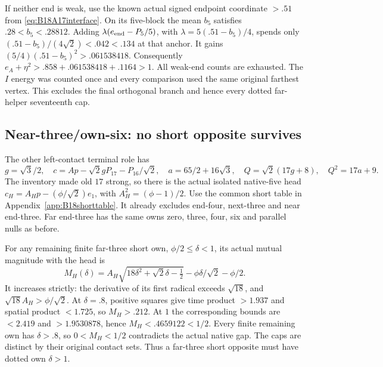 If neither end is weak, use the known actual signed endpoint
coordinate \(>.51\) from \eqref{eq:B18A17interface}.
On its five-block the mean \(b_5\) satisfies \(.28<b_5<.28812\).
Adding \(\lambda(e_{\rm end}-P_5/5)\), with
\(\lambda=5(.51-b_5)/4\), spends only
\((.51-b_5)/(4\sqrt2)<.042<.134\) at that anchor.
It gains \((5/4)(.51-b_5)^2>.061538418\).
Consequently \(e_A+\eta^2>.858+.061538418+.1164>1\).
All weak-end counts are exhausted. The \(I\) energy was counted once
and every comparison used the same original farthest vertex.
This excludes the final orthogonal branch and hence every dotted
far-helper seventeenth cap.

\subsection{Near-three/own-six: no short opposite survives}
\label{app:B18near6}
The other left-contact terminal role has
\[
 g=\sqrt3/2,\quad
 c=Ap-\sqrt2gP_{17}-P_{16}/\sqrt2,\quad
 a=65/2+16\sqrt3,\quad Q=\sqrt2(17g+8),\quad Q^2=17a+9 .
\]
The inventory made old \(17\) strong, so there is the actual
isolated native-five head
\(c_H=A_Hp-(\phi/\sqrt2)e_1\), with
\(A_H^2=(\phi-1)/2\).
Use the common short table in Appendix~\ref{app:B18shorttable}.
It already excludes end-four, next-three and near end-three.
Far end-three has the same owns zero, three, four, six and parallel
nulls as before.

For any remaining finite far-three short own,
\(\phi/2\leq\delta<1\), its actual mutual magnitude with the head is
\[
 M_H(\delta)=A_H\sqrt{18\delta^2+\sqrt2\delta-\tfrac12}
             -\phi\delta/\sqrt2-\phi/2 .
\]
It increases strictly: the derivative of its first radical exceeds
\(\sqrt{18}\), and \(\sqrt{18}A_H>\phi/\sqrt2\).
At \(\delta=.8\), positive squares give time product \(>1.937\)
and spatial product \(<1.725\), so \(M_H>.212\).
At \(1\) the corresponding bounds are \(<2.419\) and
\(>1.9530878\), hence \(M_H<.4659122<1/2\).
Every finite remaining own has \(\delta>.8\), so
\(0<M_H<1/2\) contradicts the actual native gap.
The caps are distinct by their original contact sets.
Thus a far-three short opposite must have dotted own \(\delta>1\).

